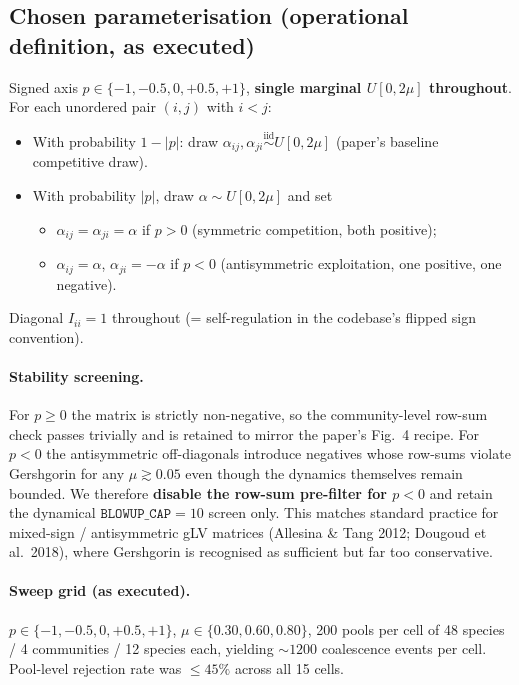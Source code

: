 \documentclass[11pt]{article}
\begin{document}
\subsection*{Chosen parameterisation (operational definition, as executed)}
Signed axis $p \in \{-1, -0.5, 0, +0.5, +1\}$, \textbf{single marginal $U[0, 2\mu]$ throughout}. For each unordered pair $(i,j)$ with $i<j$:
\begin{itemize}[itemsep=0pt]
  \item With probability $1 - |p|$: draw $\alpha_{ij}, \alpha_{ji} \stackrel{\mathrm{iid}}{\sim} U[0, 2\mu]$ (paper's baseline competitive draw).
  \item With probability $|p|$, draw $\alpha \sim U[0, 2\mu]$ and set
    \begin{itemize}[itemsep=0pt]
      \item $\alpha_{ij} = \alpha_{ji} = \alpha$ if $p > 0$ (symmetric competition, both positive);
      \item $\alpha_{ij} = \alpha$, $\alpha_{ji} = -\alpha$ if $p < 0$ (antisymmetric exploitation, one positive, one negative).
    \end{itemize}
\end{itemize}
Diagonal $I_{ii} = 1$ throughout (= self-regulation in the codebase's flipped sign convention).

\paragraph{Stability screening.} For $p \geq 0$ the matrix is strictly non-negative, so the community-level row-sum check passes trivially and is retained to mirror the paper's Fig.~4 recipe. For $p < 0$ the antisymmetric off-diagonals introduce negatives whose row-sums violate Gershgorin for any $\mu \gtrsim 0.05$ even though the dynamics themselves remain bounded. We therefore \textbf{disable the row-sum pre-filter for $p < 0$} and retain the dynamical $\texttt{BLOWUP\_CAP}=10$ screen only. This matches standard practice for mixed-sign / antisymmetric gLV matrices (Allesina \& Tang 2012; Dougoud et al.\ 2018), where Gershgorin is recognised as sufficient but far too conservative.

\paragraph{Sweep grid (as executed).} $p \in \{-1, -0.5, 0, +0.5, +1\}$, $\mu \in \{0.30, 0.60, 0.80\}$, 200 pools per cell of 48 species / 4 communities / 12 species each, yielding $\sim 1200$ coalescence events per cell. Pool-level rejection rate was $\leq 45\%$ across all 15 cells.
\end{document}

